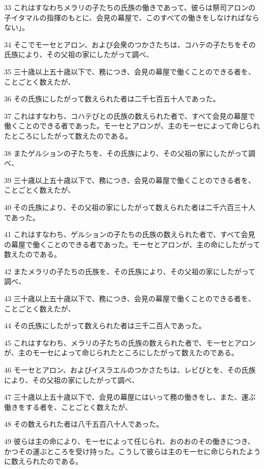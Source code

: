 \par 33 これはすなわちメラリの子たちの氏族の働きであって、彼らは祭司アロンの子イタマルの指揮のもとに、会見の幕屋で、このすべての働きをしなければならない」。
\par 34 そこでモーセとアロン、および会衆のつかさたちは、コハテの子たちをその氏族により、その父祖の家にしたがって調べ、
\par 35 三十歳以上五十歳以下で、務につき、会見の幕屋で働くことのできる者を、ことごとく数えたが、
\par 36 その氏族にしたがって数えられた者は二千七百五十人であった。
\par 37 これはすなわち、コハテびとの氏族の数えられた者で、すべて会見の幕屋で働くことのできる者であった。モーセとアロンが、主のモーセによって命じられたところにしたがって数えたのである。
\par 38 またゲルションの子たちを、その氏族により、その父祖の家にしたがって調べ、
\par 39 三十歳以上五十歳以下で、務につき、会見の幕屋で働くことのできる者を、ことごとく数えたが、
\par 40 その氏族により、その父祖の家にしたがって数えられた者は二千六百三十人であった。
\par 41 これはすなわち、ゲルションの子たちの氏族の数えられた者で、すべて会見の幕屋で働くことのできる者であった。モーセとアロンが、主の命にしたがって数えたのである。
\par 42 またメラリの子たちの氏族を、その氏族により、その父祖の家にしたがって調べ、
\par 43 三十歳以上五十歳以下で、務につき、会見の幕屋で働くことのできる者を、ことごとく数えたが、
\par 44 その氏族にしたがって数えられた者は三千二百人であった。
\par 45 これはすなわち、メラリの子たちの氏族の数えられた者で、モーセとアロンが、主のモーセによって命じられたところにしたがって数えたのである。
\par 46 モーセとアロン、およびイスラエルのつかさたちは、レビびとを、その氏族により、その父祖の家にしたがって調べ、
\par 47 三十歳以上五十歳以下で、会見の幕屋にはいって務の働きをし、また、運ぶ働きをする者を、ことごとく数えたが、
\par 48 その数えられた者は八千五百八十人であった。
\par 49 彼らは主の命により、モーセによって任じられ、おのおのその働きにつき、かつその運ぶところを受け持った。こうして彼らは主のモーセに命じられたように数えられたのである。

